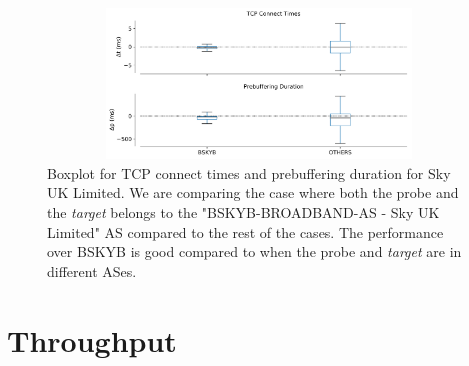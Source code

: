 \begin{figure}[!ht]
	\centering
	\includegraphics[keepaspectratio, height=4cm, width=15cm]{figures/tcp/netflix-delay-boxplot-bskyb.pdf}
	\caption[TCP Connect Times and Prebuffering Duration Boxplot for BSKYB]{Boxplot for TCP connect times and prebuffering duration for Sky UK Limited. We are comparing the case where both the probe and the \textit{target} belongs to the "BSKYB-BROADBAND-AS - Sky UK Limited" AS compared to the rest of the cases. The performance over BSKYB is good compared to when the probe and \textit{target} are in different ASes.}
	\label{fig:TCP Connect Times and Prebuffering Duration Boxplot for BSKYB}
\end{figure}

\FloatBarrier

\section{Throughput}

